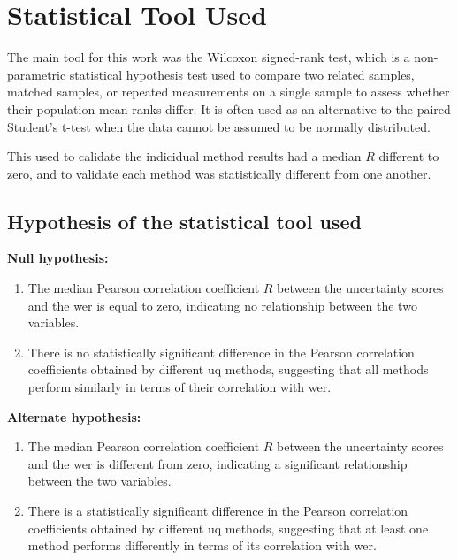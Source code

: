 \section{Statistical Tool Used}

The main tool for this work was the Wilcoxon signed-rank test\cite{Wilcoxon1945IndividualCB}, which is a non-parametric statistical hypothesis test used to compare two related samples, matched samples, or repeated measurements on a single sample to assess whether their population mean ranks differ. It is often used as an alternative to the paired Student's t-test when the data cannot be assumed to be normally distributed.

This used to calidate the indicidual method results had a median $R$ different to zero, and to validate each method was statistically different from one another.
\subsection{Hypothesis of the statistical tool used}

\textbf{Null hypothesis:}
\begin{enumerate}
	\item The median Pearson correlation coefficient $R$ between the uncertainty scores and the \acrshort{wer} is equal to zero, indicating no relationship between the two variables.
	\item There is no statistically significant difference in the Pearson correlation coefficients obtained by different \acrshort{uq} methods, suggesting that all methods perform similarly in terms of their correlation with \acrshort{wer}.
\end{enumerate}

\textbf{Alternate hypothesis:}
\begin{enumerate}
	\item The median Pearson correlation coefficient $R$ between the uncertainty scores and the \acrshort{wer} is different from zero, indicating a significant relationship between the two variables.
	\item There is a statistically significant difference in the Pearson correlation coefficients obtained by different \acrshort{uq} methods, suggesting that at least one method performs differently in terms of its correlation with \acrshort{wer}.
\end{enumerate}

